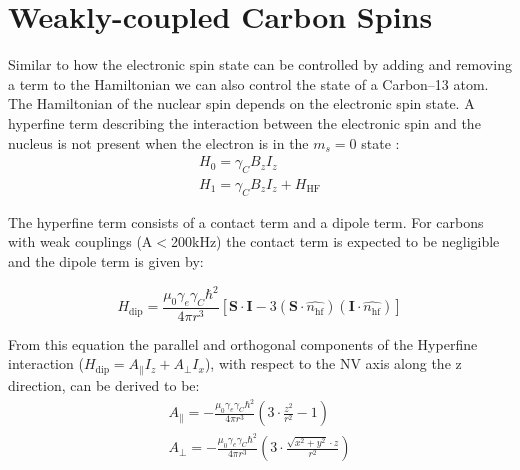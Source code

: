 
\chapter{Weakly-coupled Carbon Spins}
Similar to how the electronic spin state can be controlled by adding and removing a term to the Hamiltonian we can also control the state of a Carbon--13 atom. The Hamiltonian of the nuclear spin depends on the electronic spin state\citep{Taminiau2014Universal}. A hyperfine term describing the interaction between the electronic spin and the nucleus is not present when the electron is in the $m_s = 0$ state :
 \begin{eqnarray}
H_0= \gamma_C B_z I_z \\
H_1 = \gamma_C B_z I_z +H_{\mathrm{HF}}
\end{eqnarray}

The hyperfine term consists of a contact term and a dipole term. For carbons with weak couplings  (A$<$200kHz) the contact term is expected to be negligible and the dipole term is given by\cite{Lange2012Quantum}:

\begin{equation}
H_{\mathrm{dip}} = \frac{\mu_0 \gamma_e \gamma_C \hbar^2 }{4 \pi r^3} [ \bm{S \cdot I} - 3 (\bm S \cdot \hat{n_{\mathrm{hf}}})(\bm I \cdot \hat{n_{\mathrm{hf}}})]
\end{equation}

From this equation the parallel and orthogonal components of the Hyperfine interaction ($H_{\mathrm{dip}} = A_\parallel I_z + A_\perp I_x $), with respect to the NV axis along the z direction, can be derived to be:
 \begin{eqnarray}
A_\parallel= - \frac{\mu_0 \gamma_e \gamma_C \hbar^2 }{4 \pi r^3} \left(3\cdot \frac{z^2}{r^2}-1\right)\\
 A_\perp =  -\frac{\mu_0 \gamma_e \gamma_C \hbar^2 }{4 \pi r^3}\left( 3\cdot\frac{\sqrt{x^2+y^2}\cdot z}{r^2}\right)
\end{eqnarray}


